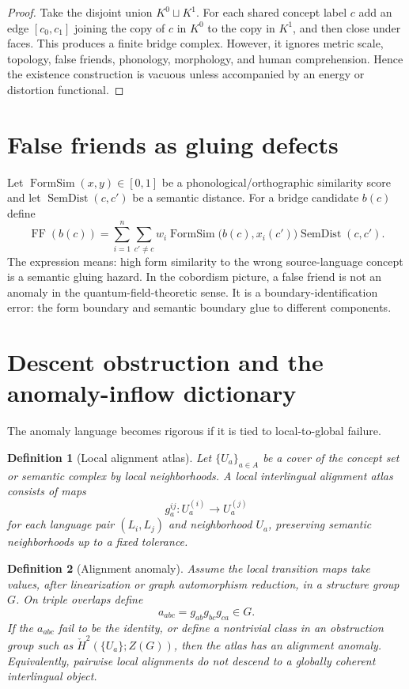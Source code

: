 \documentclass[11pt]{article}
\newtheorem{definition}{Definition}[section]
\newcommand{\FF}{\operatorname{FF}}
\begin{document}
\begin{proof}
Take the disjoint union $K^0\sqcup K^1$.  For each shared concept label $c$ add an edge $[c_0,c_1]$ joining the copy of $c$ in $K^0$ to the copy in $K^1$, and then close under faces.  This produces a finite bridge complex.  However, it ignores metric scale, topology, false friends, phonology, morphology, and human comprehension.  Hence the existence construction is vacuous unless accompanied by an energy or distortion functional.
\end{proof}

\section{False friends as gluing defects}

Let $\operatorname{FormSim}(x,y)\in[0,1]$ be a phonological/orthographic similarity score and let $\operatorname{SemDist}(c,c')$ be a semantic distance.  For a bridge candidate $b(c)$ define
\[
  \FF(b(c))
  =\sum_{i=1}^{n}\sum_{c'\ne c}w_i
  \operatorname{FormSim}\bigl(b(c),x_i(c')\bigr)
  \operatorname{SemDist}(c,c').
\]
The expression means: high form similarity to the wrong source-language concept is a semantic gluing hazard.  In the cobordism picture, a false friend is not an anomaly in the quantum-field-theoretic sense.  It is a boundary-identification error: the form boundary and semantic boundary glue to different components.

\section{Descent obstruction and the anomaly-inflow dictionary}

The anomaly language becomes rigorous if it is tied to local-to-global failure.

\begin{definition}[Local alignment atlas]
Let $\{U_a\}_{a\in A}$ be a cover of the concept set or semantic complex by local neighborhoods.  A local interlingual alignment atlas consists of maps
\[
  g^{ij}_a: U_a^{(i)}\to U_a^{(j)}
\]
for each language pair $(L_i,L_j)$ and neighborhood $U_a$, preserving semantic neighborhoods up to a fixed tolerance.
\end{definition}

\begin{definition}[Alignment anomaly]
Assume the local transition maps take values, after linearization or graph automorphism reduction, in a structure group $G$.  On triple overlaps define
\[
  a_{abc}=g_{ab}g_{bc}g_{ca}\in G.
\]
If the $a_{abc}$ fail to be the identity, or define a nontrivial class in an obstruction group such as $\check H^2(\{U_a\};Z(G))$, then the atlas has an alignment anomaly.  Equivalently, pairwise local alignments do not descend to a globally coherent interlingual object.
\end{definition}
\end{document}
